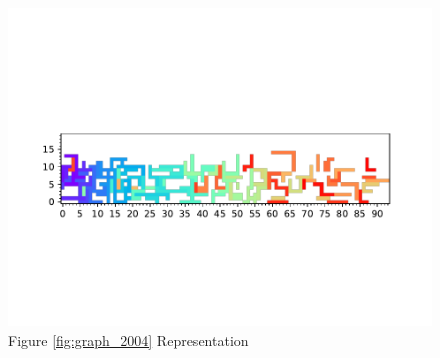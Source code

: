 \documentclass{standalone}
\begin{document}
\begin{figure}[!htb]
	\caption{Figure \ref{fig:graph_2004} Representation}
	\label{fig:picture_2004}
	\includegraphics[width=\textwidth]{../graphs/picture/2004.pdf}
\end{figure}
\end{document}
